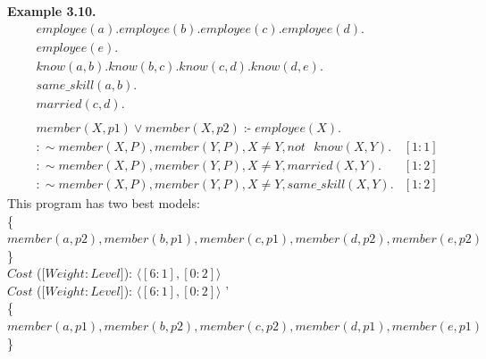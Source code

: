 \documentclass[14pt,a4paper, titlepage]{article}
\DeclareMathOperator{\leftimpl}{:-}
\begin{document}
\textbf{Example 3.10.}
\begin{align*}
& \mathit{employee}(a). \mathit{employee}(b).   \mathit{employee}(c). \mathit{employee(d)}. \\
& \mathit{employee}(e). \\
& \mathit{know}(a,b). \mathit{know}(b,c). \mathit{know}(c,d). \mathit{know}(d,e). \\
& \mathit{same\_skill}(a,b). \\
& \mathit{married(c,d)}. \\
&  \\ 
& \mathit{member}(X,p1) \vee \mathit{member}(X,p2) \leftimpl \mathit{employee}(X).\\
& : \sim \mathit{member}(X,P), \mathit{member}(Y,P), X \neq Y, \mathit{not} \text{ } \mathit{know(X,Y)}. & [1:1] \\
& : \sim  \mathit{member}(X,P), \mathit{member}(Y,P), X \neq Y, \mathit{marrie}d(X,Y). & [1:2]\\
& : \sim member(X,P), member(Y,P), X \neq Y, same\_skill(X,Y). & [1:2] 
\end{align*}
This program has two best models:
\\ \{$\mathit{member}(a,p2), \mathit{member}(b,p1), \mathit{member}(c,p1), \mathit{member}(d,p2), \mathit{member}(e,p2)$\}
\\$\mathit{Cost}$ ($[ \mathit{Weight:Level]}$): $ \langle [6:1],[0:2] \rangle $
\\$\mathit{Cost}$ ($[ \mathit{Weight:Level]}$): $ \langle [6:1],[0:2] \rangle $ '\\
\{$\mathit{member}(a,p1), \mathit{member}(b,p2), \mathit{member}(c,p2), \mathit{member}(d,p1), \mathit{member}(e,p1)$\}
\end{document}
